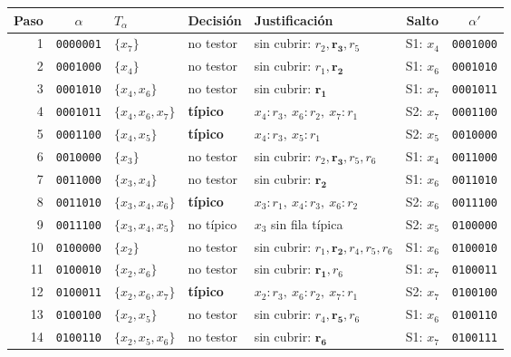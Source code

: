 \begin{tabular}{r c l l l c c}
\toprule
Paso & $\alpha$ & $T_\alpha$ & Decisión & Justificación & Salto & $\alpha'$ \\
\midrule
1 & \texttt{0000001} & $\{x_{7}\}$ & no testor & sin cubrir: $r_{2},\mathbf{r}_{\mathbf{3}},r_{5}$ & S1: $x_{4}$ & \texttt{0001000} \\
2 & \texttt{0001000} & $\{x_{4}\}$ & no testor & sin cubrir: $r_{1},\mathbf{r}_{\mathbf{2}}$ & S1: $x_{6}$ & \texttt{0001010} \\
3 & \texttt{0001010} & $\{x_{4},x_{6}\}$ & no testor & sin cubrir: $\mathbf{r}_{\mathbf{1}}$ & S1: $x_{7}$ & \texttt{0001011} \\
4 & \texttt{0001011} & $\{x_{4},x_{6},x_{7}\}$ & \textbf{típico} & $x_{4}{:}r_{3},\ x_{6}{:}r_{2},\ x_{7}{:}r_{1}$ & S2: $x_{7}$ & \texttt{0001100} \\
5 & \texttt{0001100} & $\{x_{4},x_{5}\}$ & \textbf{típico} & $x_{4}{:}r_{3},\ x_{5}{:}r_{1}$ & S2: $x_{5}$ & \texttt{0010000} \\
6 & \texttt{0010000} & $\{x_{3}\}$ & no testor & sin cubrir: $r_{2},\mathbf{r}_{\mathbf{3}},r_{5},r_{6}$ & S1: $x_{4}$ & \texttt{0011000} \\
7 & \texttt{0011000} & $\{x_{3},x_{4}\}$ & no testor & sin cubrir: $\mathbf{r}_{\mathbf{2}}$ & S1: $x_{6}$ & \texttt{0011010} \\
8 & \texttt{0011010} & $\{x_{3},x_{4},x_{6}\}$ & \textbf{típico} & $x_{3}{:}r_{1},\ x_{4}{:}r_{3},\ x_{6}{:}r_{2}$ & S2: $x_{6}$ & \texttt{0011100} \\
9 & \texttt{0011100} & $\{x_{3},x_{4},x_{5}\}$ & no típico & $x_{3}$ sin fila típica & S2: $x_{5}$ & \texttt{0100000} \\
10 & \texttt{0100000} & $\{x_{2}\}$ & no testor & sin cubrir: $r_{1},\mathbf{r}_{\mathbf{2}},r_{4},r_{5},r_{6}$ & S1: $x_{6}$ & \texttt{0100010} \\
11 & \texttt{0100010} & $\{x_{2},x_{6}\}$ & no testor & sin cubrir: $\mathbf{r}_{\mathbf{1}},r_{6}$ & S1: $x_{7}$ & \texttt{0100011} \\
12 & \texttt{0100011} & $\{x_{2},x_{6},x_{7}\}$ & \textbf{típico} & $x_{2}{:}r_{3},\ x_{6}{:}r_{2},\ x_{7}{:}r_{1}$ & S2: $x_{7}$ & \texttt{0100100} \\
13 & \texttt{0100100} & $\{x_{2},x_{5}\}$ & no testor & sin cubrir: $r_{4},\mathbf{r}_{\mathbf{5}},r_{6}$ & S1: $x_{6}$ & \texttt{0100110} \\
14 & \texttt{0100110} & $\{x_{2},x_{5},x_{6}\}$ & no testor & sin cubrir: $\mathbf{r}_{\mathbf{6}}$ & S1: $x_{7}$ & \texttt{0100111} \\

\end{tabular}
